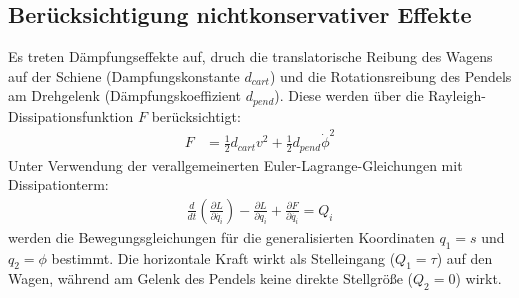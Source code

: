 \subsection{Berücksichtigung nichtkonservativer Effekte}
Es treten Dämpfungseffekte auf, druch die translatorische Reibung des Wagens auf der Schiene (Dampfungskonstante $d_{cart}$) und die Rotationsreibung des Pendels am Drehgelenk (Dämpfungskoeffizient $d_{pend}$).
Diese werden über die Rayleigh-Dissipationsfunktion $F$ berücksichtigt:
\begin{align}
    F &= \frac{1}{2} d_{cart} v^2 + \frac{1}{2} d_{pend} \dot{\phi}^2
\end{align}
Unter Verwendung der verallgemeinerten Euler-Lagrange-Gleichungen mit Dissipationterm:
\begin{align}
    \frac{d}{dt} \left( \frac{\partial L}{\partial \dot{q_i}} \right) - \frac{\partial L}{\partial q_i} + \frac{\partial F}{\partial \dot{q_i}} = Q_i
    \label{eq:euler_lagrange_general}
\end{align}
werden die Bewegungsgleichungen für die generalisierten Koordinaten $q_1 = s$ und $q_2 = \phi$ bestimmt.
Die horizontale Kraft wirkt als Stelleingang ($Q_1 = \tau$) auf den Wagen, während am Gelenk des Pendels keine direkte Stellgröße ($Q_2 = 0$) wirkt.
